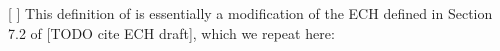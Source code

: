 
[ ] This definition of  is essentially a modification of the ECH  defined in Section 7.2 of [TODO cite ECH draft], which we repeat here:

